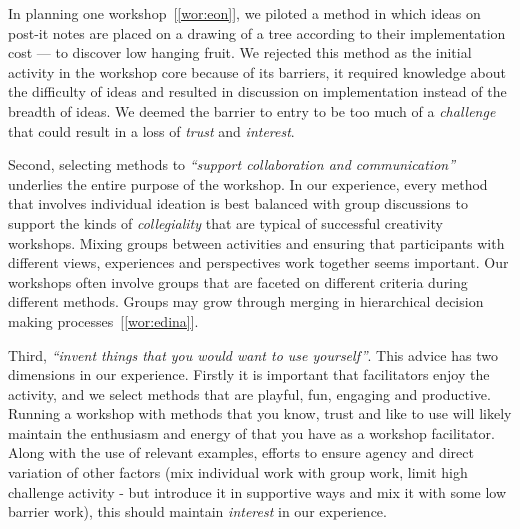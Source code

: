 In planning one workshop~[\ref{wor:eon}], we piloted a method in which ideas on post-it notes are placed on a drawing of a tree according to their implementation cost --- to discover low hanging fruit. We rejected this method as the initial activity in the workshop core because of its barriers, it required knowledge about the difficulty of ideas and resulted in discussion on implementation instead of the breadth of ideas. We deemed the barrier to entry to be too much of a \emph{challenge} that could result in a loss of  \emph{trust} and  \emph{interest}. 

Second, selecting methods to \emph{``support collaboration and communication''} underlies the entire purpose of the workshop. In our experience, every method that involves individual ideation is best balanced with group discussions to support the kinds of \emph{collegiality} that are typical of successful creativity workshops. Mixing groups between activities and ensuring that participants with different views, experiences and perspectives work together seems important. Our workshops often involve groups that are faceted on different criteria during different methods. Groups may grow through merging in hierarchical decision making processes~[\ref{wor:edina}].

Third, \emph{``invent things that you would want to use yourself''}. This advice has two dimensions in our experience. Firstly it is important that facilitators enjoy the activity, and we select methods that are playful, fun, engaging and productive. Running a workshop with methods that you know, trust and like to use will likely maintain the enthusiasm and energy of that you have as a workshop facilitator. Along with the use of relevant examples, efforts to ensure agency and direct variation of other factors (mix individual work with group work, limit high challenge activity - but introduce it in supportive ways and mix it with some low barrier work), this should maintain \emph{interest} in our experience. 




